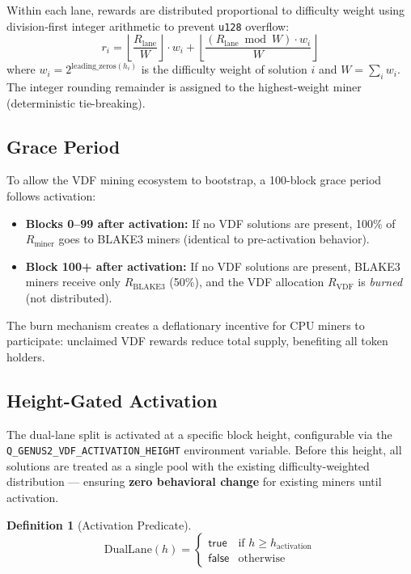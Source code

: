 \documentclass[11pt,a4paper]{article}
\newtheorem{definition}{Definition}[section]
\begin{document}
Within each lane, rewards are distributed proportional to difficulty weight using division-first integer arithmetic to prevent \texttt{u128} overflow:
\begin{equation}
    r_i = \left\lfloor \frac{R_{\mathrm{lane}}}{W} \right\rfloor \cdot w_i + \left\lfloor \frac{(R_{\mathrm{lane}} \bmod W) \cdot w_i}{W} \right\rfloor
\end{equation}
where $w_i = 2^{\mathrm{leading\_zeros}(h_i)}$ is the difficulty weight of solution $i$ and $W = \sum_i w_i$. The integer rounding remainder is assigned to the highest-weight miner (deterministic tie-breaking).

\subsection{Grace Period}

To allow the VDF mining ecosystem to bootstrap, a 100-block grace period follows activation:

\begin{itemize}
    \item \textbf{Blocks 0--99 after activation:} If no VDF solutions are present, 100\% of $R_{\mathrm{miner}}$ goes to BLAKE3 miners (identical to pre-activation behavior).
    \item \textbf{Block 100+ after activation:} If no VDF solutions are present, BLAKE3 miners receive only $R_{\mathrm{BLAKE3}}$ (50\%), and the VDF allocation $R_{\mathrm{VDF}}$ is \emph{burned} (not distributed).
\end{itemize}

The burn mechanism creates a deflationary incentive for CPU miners to participate: unclaimed VDF rewards reduce total supply, benefiting all token holders.

\subsection{Height-Gated Activation}

The dual-lane split is activated at a specific block height, configurable via the \texttt{Q\_GENUS2\_VDF\_ACTIVATION\_HEIGHT} environment variable. Before this height, all solutions are treated as a single pool with the existing difficulty-weighted distribution --- ensuring \textbf{zero behavioral change} for existing miners until activation.

\begin{definition}[Activation Predicate]
\begin{equation}
    \mathrm{DualLane}(h) = \begin{cases}
        \mathsf{true} & \text{if } h \geq h_{\mathrm{activation}} \\
        \mathsf{false} & \text{otherwise}
    \end{cases}
\end{equation}
\end{definition}
\end{document}
